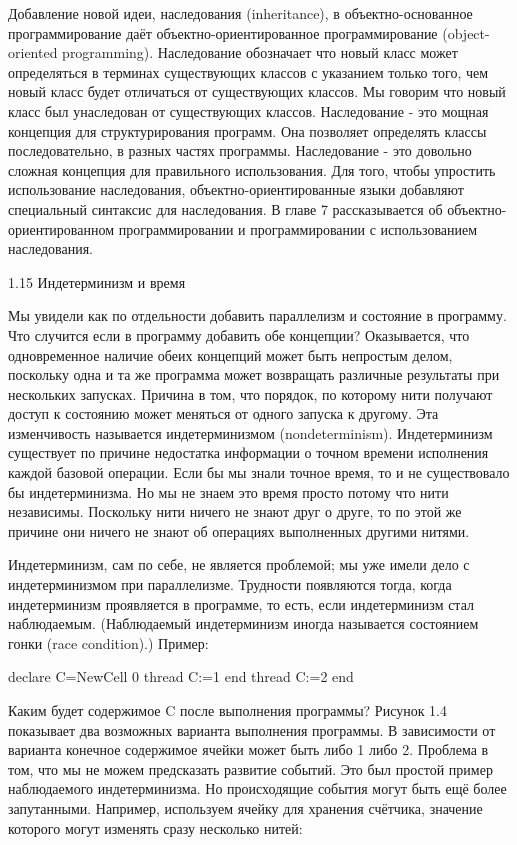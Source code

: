 Добавление новой идеи, наследования (inheritance), в объектно-основанное программирование даёт объектно-ориентированное программирование (object-oriented programming). Наследование обозначает что новый класс может определяться в терминах существующих классов с указанием только того, чем новый класс будет отличаться от существующих классов. Мы говорим что новый класс был унаследован от существующих классов. Наследование - это мощная концепция для структурирования программ. Она позволяет определять классы последовательно, в разных частях программы. Наследование - это довольно сложная концепция для правильного использования. Для того, чтобы упростить использование наследования, объектно-ориентированные языки добавляют специальный синтаксис для наследования. В главе 7 рассказывается об объектно-ориентированном программировании и программировании с использованием наследования.

1.15 Индетерминизм и время

Мы увидели как по отдельности добавить параллелизм и состояние в программу. Что случится если в программу добавить обе концепции? Оказывается, что одновременное наличие обеих концепций может быть непростым делом, поскольку одна и та же программа может возвращать различные результаты при нескольких запусках. Причина в том, что порядок, по которому нити получают доступ к состоянию может меняться от одного запуска к другому. Эта изменчивость называется индетерминизмом (nondeterminism). Индетерминизм существует по причине недостатка информации о точном времени исполнения каждой базовой операции. Если бы мы знали точное время, то и не существовало бы индетерминизма. Но мы не знаем это время просто потому что нити независимы. Поскольку нити ничего не знают друг о друге, то по этой же причине они ничего не знают об операциях выполненных другими нитями.

Индетерминизм, сам по себе, не является проблемой; мы уже имели дело с индетерминизмом при параллелизме. Трудности появляются тогда, когда индетерминизм проявляется в программе, то есть, если индетерминизм стал наблюдаемым. (Наблюдаемый индетерминизм иногда называется состоянием гонки (race condition).) Пример:

declare
C={NewCell 0}
thread
C:=1
end
thread
C:=2
end

Каким будет содержимое C после выполнения программы? Рисунок 1.4 показывает два возможных варианта выполнения программы. В зависимости от варианта конечное содержимое ячейки может быть либо 1 либо 2. Проблема в том, что мы не можем предсказать развитие событий. Это был простой пример наблюдаемого индетерминизма. Но происходящие события могут быть ещё более запутанными. Например, используем ячейку для хранения счётчика, значение которого могут изменять сразу несколько нитей:

